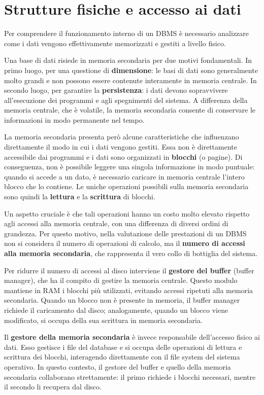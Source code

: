 \section{Strutture fisiche e accesso ai dati}

Per comprendere il funzionamento interno di un DBMS è necessario analizzare come i dati vengono effettivamente memorizzati e gestiti a livello fisico.

Una base di dati risiede in memoria secondaria per due motivi fondamentali. 
In primo luogo, per una questione di \textbf{dimensione}: le basi di dati sono generalmente molto grandi e non possono essere contenute interamente in memoria centrale. 
In secondo luogo, per garantire la \textbf{persistenza}: i dati devono sopravvivere all'esecuzione dei programmi e agli spegnimenti del sistema. 
A differenza della memoria centrale, che è volatile, la memoria secondaria consente di conservare le informazioni in modo permanente nel tempo.

La memoria secondaria presenta però alcune caratteristiche che influenzano direttamente il modo in cui i dati vengono gestiti. 
Essa non è direttamente accessibile dai programmi e i dati sono organizzati in \textbf{blocchi} (o pagine). 
Di conseguenza, non è possibile leggere una singola informazione in modo puntuale: quando si accede a un dato, è necessario caricare in memoria centrale l'intero blocco che lo contiene. 
Le uniche operazioni possibili sulla memoria secondaria sono quindi la \textbf{lettura} e la \textbf{scrittura} di blocchi.

Un aspetto cruciale è che tali operazioni hanno un costo molto elevato rispetto agli accessi alla memoria centrale, con una differenza di diversi ordini di grandezza. 
Per questo motivo, nella valutazione delle prestazioni di un DBMS non si considera il numero di operazioni di calcolo, ma il \textbf{numero di accessi alla memoria secondaria}, che rappresenta il vero collo di bottiglia del sistema.

Per ridurre il numero di accessi al disco interviene il \textbf{gestore del buffer} (buffer manager), che ha il compito di gestire la memoria centrale. 
Questo modulo mantiene in RAM i blocchi più utilizzati, evitando accessi ripetuti alla memoria secondaria. 
Quando un blocco non è presente in memoria, il buffer manager richiede il caricamento dal disco; analogamente, quando un blocco viene modificato, si occupa della sua scrittura in memoria secondaria.

Il \textbf{gestore della memoria secondaria} è invece responsabile dell'accesso fisico ai dati. 
Esso gestisce i file del database e si occupa delle operazioni di lettura e scrittura dei blocchi, interagendo direttamente con il file system del sistema operativo. 
In questo contesto, il gestore del buffer e quello della memoria secondaria collaborano strettamente: il primo richiede i blocchi necessari, mentre il secondo li recupera dal disco.

